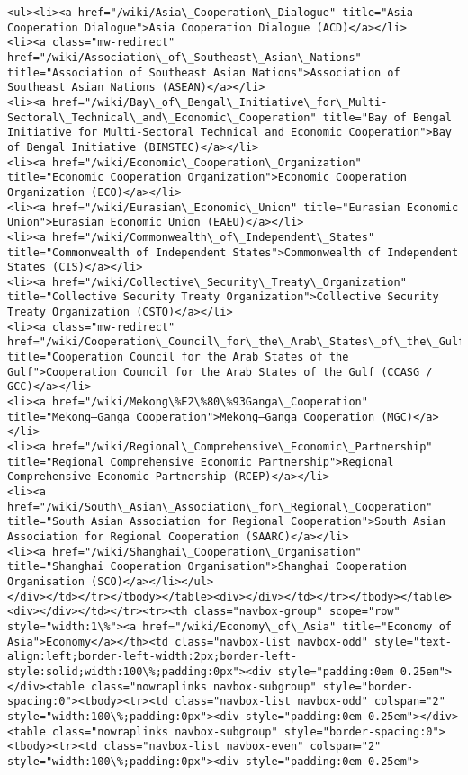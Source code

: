 \documentclass[11pt]{article}
\begin{document}
\begin{Verbatim}[commandchars=\\\{\}]
<ul><li><a href="/wiki/Asia\_Cooperation\_Dialogue" title="Asia Cooperation Dialogue">Asia Cooperation Dialogue (ACD)</a></li>
<li><a class="mw-redirect" href="/wiki/Association\_of\_Southeast\_Asian\_Nations" title="Association of Southeast Asian Nations">Association of Southeast Asian Nations (ASEAN)</a></li>
<li><a href="/wiki/Bay\_of\_Bengal\_Initiative\_for\_Multi-Sectoral\_Technical\_and\_Economic\_Cooperation" title="Bay of Bengal Initiative for Multi-Sectoral Technical and Economic Cooperation">Bay of Bengal Initiative (BIMSTEC)</a></li>
<li><a href="/wiki/Economic\_Cooperation\_Organization" title="Economic Cooperation Organization">Economic Cooperation Organization (ECO)</a></li>
<li><a href="/wiki/Eurasian\_Economic\_Union" title="Eurasian Economic Union">Eurasian Economic Union (EAEU)</a></li>
<li><a href="/wiki/Commonwealth\_of\_Independent\_States" title="Commonwealth of Independent States">Commonwealth of Independent States (CIS)</a></li>
<li><a href="/wiki/Collective\_Security\_Treaty\_Organization" title="Collective Security Treaty Organization">Collective Security Treaty Organization (CSTO)</a></li>
<li><a class="mw-redirect" href="/wiki/Cooperation\_Council\_for\_the\_Arab\_States\_of\_the\_Gulf" title="Cooperation Council for the Arab States of the Gulf">Cooperation Council for the Arab States of the Gulf (CCASG / GCC)</a></li>
<li><a href="/wiki/Mekong\%E2\%80\%93Ganga\_Cooperation" title="Mekong–Ganga Cooperation">Mekong–Ganga Cooperation (MGC)</a></li>
<li><a href="/wiki/Regional\_Comprehensive\_Economic\_Partnership" title="Regional Comprehensive Economic Partnership">Regional Comprehensive Economic Partnership (RCEP)</a></li>
<li><a href="/wiki/South\_Asian\_Association\_for\_Regional\_Cooperation" title="South Asian Association for Regional Cooperation">South Asian Association for Regional Cooperation (SAARC)</a></li>
<li><a href="/wiki/Shanghai\_Cooperation\_Organisation" title="Shanghai Cooperation Organisation">Shanghai Cooperation Organisation (SCO)</a></li></ul>
</div></td></tr></tbody></table><div></div></td></tr></tbody></table><div></div></td></tr><tr><th class="navbox-group" scope="row" style="width:1\%"><a href="/wiki/Economy\_of\_Asia" title="Economy of Asia">Economy</a></th><td class="navbox-list navbox-odd" style="text-align:left;border-left-width:2px;border-left-style:solid;width:100\%;padding:0px"><div style="padding:0em 0.25em"></div><table class="nowraplinks navbox-subgroup" style="border-spacing:0"><tbody><tr><td class="navbox-list navbox-odd" colspan="2" style="width:100\%;padding:0px"><div style="padding:0em 0.25em"></div><table class="nowraplinks navbox-subgroup" style="border-spacing:0"><tbody><tr><td class="navbox-list navbox-even" colspan="2" style="width:100\%;padding:0px"><div style="padding:0em 0.25em">

\end{Verbatim}
\end{document}
